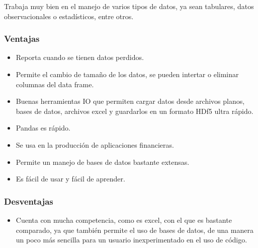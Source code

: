 \documentclass[a4paper]{article}
\begin{document}
Trabaja muy bien en el manejo de varios tipos de datos, ya sean tabulares, datos observacionales o estadísticos, entre otros.

\subsubsection{Ventajas}
\begin{itemize}
\item Reporta cuando se tienen datos perdidos.
\item Permite el cambio de tamaño de los datos, se pueden intertar o eliminar columnas del data frame.
\item Buenas herramientas IO que permiten cargar datos desde archivos planos, bases de datos, archivos excel y guardarlos en un formato HDf5 ultra rápido. 
\item Pandas es rápido.
\item Se usa en la producción de aplicaciones financieras.
\item Permite un manejo de bases de datos bastante extensas.
\item Es fácil de usar y fácil de aprender.
\end{itemize}

\subsubsection{Desventajas}
\begin{itemize}
\item Cuenta con mucha competencia, como es excel, con el que es bastante comparado, ya que también permite el uso de bases de datos, de una manera un poco más sencilla para un usuario inexperimentado en el uso de código. 
\end{itemize}
\end{document}
